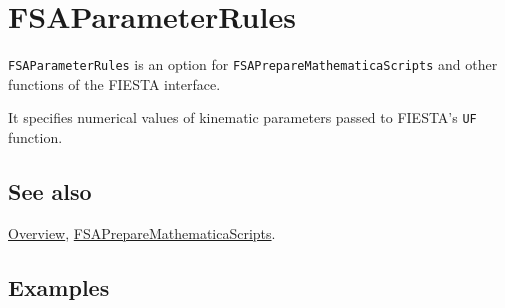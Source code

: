 \documentclass[../FeynHelpersManual.tex]{subfiles}
\begin{document}
\hypertarget{fsaparameterrules}{
\section{FSAParameterRules}\label{fsaparameterrules}}

\texttt{FSAParameterRules} is an option for
\texttt{FSAPrepareMathematicaScripts} and other functions of the FIESTA
interface.

It specifies numerical values of kinematic parameters passed to FIESTA's
\texttt{UF} function.

\subsection{See also}

\hyperlink{toc}{Overview},
\hyperlink{fsapreparemathematicascripts}{FSAPrepareMathematicaScripts}.

\subsection{Examples}
\end{document}
